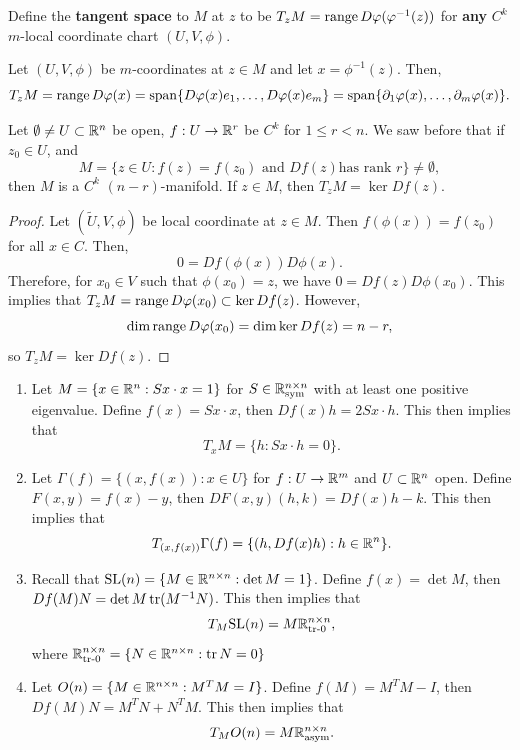 \documentclass[a4paper]{article}
\begin{document}
\begin{defi}
Define the \textbf{tangent space} to $M$
at $z$ to be $T_z M = \operatorname{range} D\varphi (\varphi^{-1}(z))$
for \textbf{any} $C^k$ $m$-local coordinate chart
$(U, V, \phi)$.
\end{defi}

\begin{eg}
Let $(U, V, \phi)$ be $m$-coordinates at $z \in M$ and
let $x = \phi^{-1}(z)$. Then,
\[
T_z M = \operatorname{range} D\varphi(x) = \operatorname{span} \{D \varphi(x) e_1, \dots,
D \varphi(x) e_m\} =
\operatorname{span} \{\partial_1 \varphi(x), \dots, \partial_m \varphi(x)\}.
\]
\end{eg}

\begin{thm}
Let $\emptyset \neq U \subset \mathbb{R}^n$ be open, $f : U \to \mathbb{R}^r$
be $C^k$ for $1 \leq r < n$. We saw before that if $z_0 \in U$,
and
\[
M = \{z \in U : \text{$f(z) = f(z_0)$ and $Df(z)$
has rank $r$}\} \neq \emptyset,
\]
then $M$ is a $C^k$ $(n - r)$-manifold. If $z \in M$, then
$T_z M = \ker Df(z)$.
\end{thm}

\begin{proof}
Let $(\tilde{U}, V, \phi)$ be local coordinate at $z \in M$.
Then $f(\phi(x)) = f(z_0)$ for all $x \in C$. Then,
\[
0 = Df(\phi(x)) D\phi(x).
\]
Therefore, for $x_0 \in V$ such that $\phi(x_0) = z$, we have
$0 = Df(z) D\phi(x_0)$. This implies that
$T_z M = \operatorname{range} D\varphi(x_0) \subset \ker Df(z)$. However,
\[
\dim \operatorname{range} D\varphi(x_0) = \dim \ker Df(z) = n - r,
\]
so
$T_z M = \ker Df(z)$.
\end{proof}

\begin{eg}
\begin{enumerate}
\item Let $M = \{x \in \mathbb{R}^n : S x \cdot x = 1\}$
for $S \in \mathbb{R}^{n \times n}_{\text{sym}}$
with at least one positive eigenvalue. Define
$f(x) = Sx \cdot x$, then
$Df(x) h = 2 Sx \cdot h$. This then implies that
\[
T_x M = \{h : Sx \cdot h = 0\}.
\]

\item Let $\Gamma(f) = \{(x, f(x)) : x \in U\}$ for
$f : U \to \mathbb{R}^m$ and $U \subset \mathbb{R}^n$ open. Define
$F(x, y) = f(x) - y$, then $DF(x, y) (h, k) = Df(x) h - k$.
This then implies that
\[
T_{(x, f(x))} \Gamma(f) = \{(h, Df(x) h) : h \in \mathbb{R}^n\}.
\]

\item Recall that $\mathrm{SL}(n) = \{M \in \mathbb{R}^{n \times n} :
\det M = 1\}$. Define
$f(x) = \det M$, then $Df(M) N = \det M \operatorname{tr} (M^{-1} N)$.
This then implies that
\[
T_M \mathrm{SL}(n) = M \mathbb{R}^{n \times n}_{\text{tr-$0$}},
\]
where $\mathbb{R}^{n \times n}_{\text{tr-$0$}} = \{N \in \mathbb{R}^{n \times n}:
\operatorname{tr} N = 0\}$

\item Let $O(n) = \{M \in \mathbb{R}^{n \times n} : M^T M = I\}$.
Define $f(M) = M^T M - I$, then $Df(M) N = M^T N + N^T M$.
This then implies that
\[
T_M O(n) = M \mathbb{R}^{n \times n}_{\text{asym}}.
\]
\end{enumerate}
\end{eg}
\end{document}
